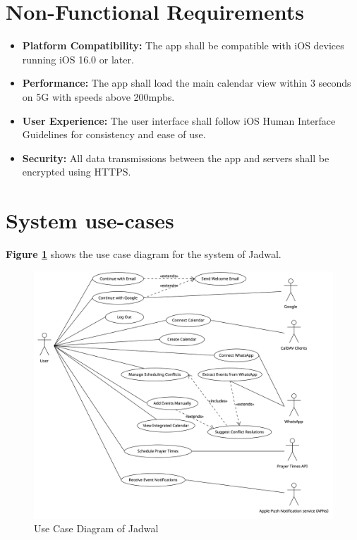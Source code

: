 \documentclass[12pt,a4paper]{report}
\begin{document}
\newpage

\section{Non-Functional Requirements}

\begin{itemize}
    \item \textbf{Platform Compatibility:} The app shall be compatible with iOS devices running iOS 16.0 or later.
    \item \textbf{Performance:} The app shall load the main calendar view within 3 seconds on 5G with speeds above 200mpbs.
    \item \textbf{User Experience:} The user interface shall follow iOS Human Interface Guidelines for consistency and ease of use.
    \item \textbf{Security:} All data transmissions between the app and servers shall be encrypted using HTTPS.
\end{itemize}
\newpage
\section{System use-cases}
   
\textbf{Figure \ref{fig:use-case-diagram}} shows the use case diagram for the system of Jadwal.

\begin{figure}[!h]
    \centering
    \includegraphics[width=\textwidth]{images/use-case-diagram.png}
    \caption{Use Case Diagram of Jadwal}
    \label{fig:use-case-diagram}
\end{figure}
\end{document}
